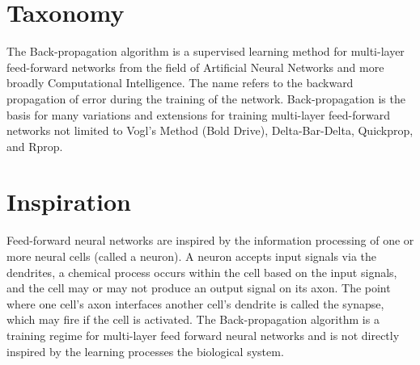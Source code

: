 \documentclass[a4paper, 11pt]{article}
\begin{document}
\section{Taxonomy}
\label{sec:taxonomy}
The Back-propagation algorithm is a supervised learning method for multi-layer feed-forward networks from the field of Artificial Neural Networks and more broadly Computational Intelligence.
The name refers to the backward propagation of error during the training of the network. Back-propagation is the basis for many variations and extensions for training multi-layer feed-forward networks not limited to Vogl's Method (Bold Drive), Delta-Bar-Delta, Quickprop, and Rprop.

\section{Inspiration}
\label{sec:inspiration}
Feed-forward neural networks are inspired by the information processing of one or more neural cells (called a neuron). 
A neuron accepts input signals via the dendrites, a chemical process occurs within the cell based on the input signals, and the cell may or may not produce an output signal on its axon. The point where one cell's axon interfaces another cell's dendrite is called the synapse, which may fire if the cell is activated.
The Back-propagation algorithm is a training regime for multi-layer feed forward neural networks and is not directly inspired by the learning processes the biological system.
\end{document}
